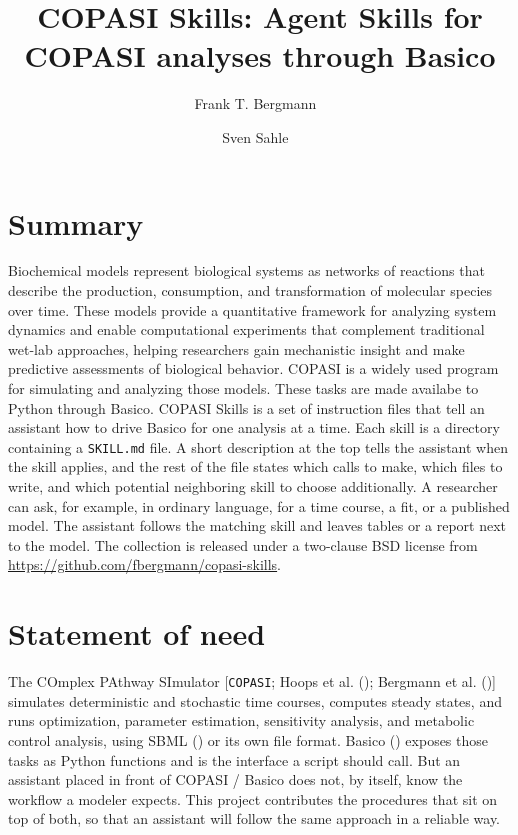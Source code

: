 \documentclass[10pt,a4paper,onecolumn]{article}
\title{COPASI Skills: Agent Skills for COPASI analyses through Basico}
\author[1]{Frank T. Bergmann%
    \,\orcidlink{0000-0001-5553-4702}\,
  }
\author[1]{Sven Sahle%
    \,\orcidlink{0000-0002-5458-7404}\,
  }
\affil[1]{BioQUANT / Heidelberg University, INF 267, Heidelberg, Germany  }
\begin{document}
  \maketitle

  \marginpar{

    \begin{flushleft}
    \sffamily\small

    \end{flushleft}
  }

  \section{Summary}\label{summary}

  Biochemical models represent biological systems as networks of reactions
  that describe the production, consumption, and transformation of
  molecular species over time. These models provide a quantitative
  framework for analyzing system dynamics and enable computational
  experiments that complement traditional wet-lab approaches, helping
  researchers gain mechanistic insight and make predictive assessments of
  biological behavior. COPASI is a widely used program for simulating and
  analyzing those models. These tasks are made availabe to Python through
  Basico. COPASI Skills is a set of instruction files that tell an
  assistant how to drive Basico for one analysis at a time. Each skill is
  a directory containing a \texttt{SKILL.md} file. A short description at
  the top tells the assistant when the skill applies, and the rest of the
  file states which calls to make, which files to write, and which
  potential neighboring skill to choose additionally. A researcher can ask,
  for example, in ordinary language, for a time course, a fit, or a
  published model. The assistant follows the matching skill and leaves
  tables or a report next to the model. The collection is released under a
  two-clause BSD license from
  \url{https://github.com/fbergmann/copasi-skills}.

  \section{Statement of need}\label{statement-of-need}

  The COmplex PAthway SImulator {[}\texttt{COPASI}; Hoops et al.
  (); Bergmann et al.
  (){]} simulates deterministic and
  stochastic time courses, computes steady states, and runs optimization,
  parameter estimation, sensitivity analysis, and metabolic control
  analysis, using SBML ()
  or its own file format. Basico
  () exposes those tasks
  as Python functions and is the interface a script should call. But an
  assistant placed in front of COPASI / Basico does not, by itself, know
  the workflow a modeler expects. This project contributes the procedures
  that sit on top of both, so that an assistant will follow the same
  approach in a reliable way.
\end{document}
